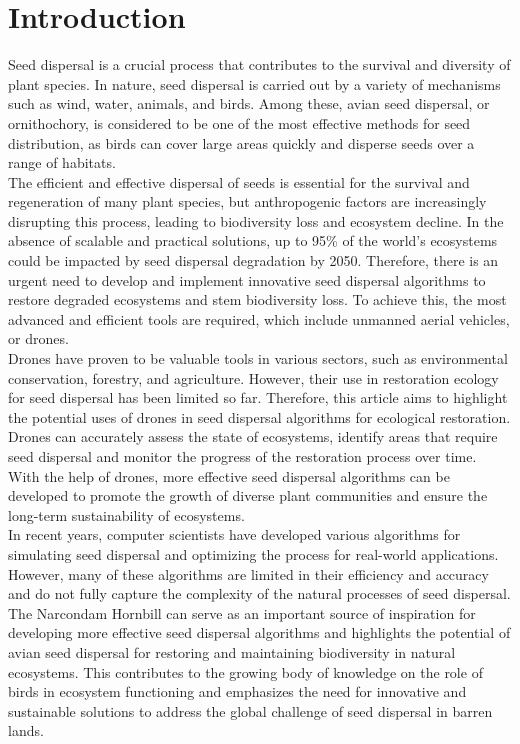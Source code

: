\documentclass[pmlr,twocolumn,10pt]{jmlr}
\begin{document}
\section{Introduction}
Seed dispersal is a crucial process that contributes to the survival and diversity of plant species. In nature, seed dispersal is carried out by a variety of mechanisms such as wind, water, animals, and birds. Among these, avian seed dispersal, or ornithochory, is considered to be one of the most effective methods for seed distribution, as birds can cover large areas quickly and disperse seeds over a range of habitats. 
\\The efficient and effective dispersal of seeds is essential for the survival and regeneration of many plant species, but anthropogenic factors are increasingly disrupting this process, leading to biodiversity loss and ecosystem decline. In the absence of scalable and practical solutions, up to 95\% of the world's ecosystems could be impacted by seed dispersal degradation by 2050. Therefore, there is an urgent need to develop and implement innovative seed dispersal algorithms to restore degraded ecosystems and stem biodiversity loss. To achieve this, the most advanced and efficient tools are required, which include unmanned aerial vehicles, or drones. 
\\Drones have proven to be valuable tools in various sectors, such as environmental conservation, forestry, and agriculture. However, their use in restoration ecology for seed dispersal has been limited so far. Therefore, this article aims to highlight the potential uses of drones in seed dispersal algorithms for ecological restoration. Drones can accurately assess the state of ecosystems, identify areas that require seed dispersal and monitor the progress of the restoration process over time. With the help of drones, more effective seed dispersal algorithms can be developed to promote the growth of diverse plant communities and ensure the long-term sustainability of ecosystems.
\\In recent years, computer scientists have developed various algorithms for simulating seed dispersal and optimizing the process for real-world applications. However, many of these algorithms are limited in their efficiency and accuracy and do not fully capture the complexity of the natural processes of seed dispersal.
\\The Narcondam Hornbill can serve as an important source of inspiration for developing more effective seed dispersal algorithms and highlights the potential of avian seed dispersal for restoring and maintaining biodiversity in natural ecosystems. This contributes to the growing body of knowledge on the role of birds in ecosystem functioning and emphasizes the need for innovative and sustainable solutions to address the global challenge of seed dispersal in barren lands.
\end{document}
